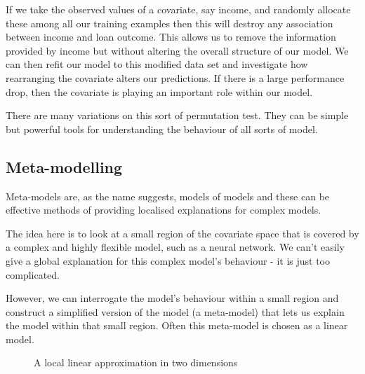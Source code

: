 \documentclass[
  letterpaper,
  DIV=11,
  numbers=noendperiod]{scrreprt}
\begin{document}
If we take the observed values of a covariate, say income, and randomly
allocate these among all our training examples then this will destroy
any association between income and loan outcome. This allows us to
remove the information provided by income but without altering the
overall structure of our model. We can then refit our model to this
modified data set and investigate how rearranging the covariate alters
our predictions. If there is a large performance drop, then the
covariate is playing an important role within our model.

There are many variations on this sort of permutation test. They can be
simple but powerful tools for understanding the behaviour of all sorts
of model.

\subsection{Meta-modelling}\label{meta-modelling}

Meta-models are, as the name suggests, models of models and these can be
effective methods of providing localised explanations for complex
models.

The idea here is to look at a small region of the covariate space that
is covered by a complex and highly flexible model, such as a neural
network. We can't easily give a global explanation for this complex
model's behaviour - it is just too complicated.

However, we can interrogate the model's behaviour within a small region
and construct a simplified version of the model (a meta-model) that lets
us explain the model within that small region. Often this meta-model is
chosen as a linear model.

\begin{figure}


\caption{\label{fig-function-approximation}A local linear approximation
in two dimensions}

\end{figure}%
\end{document}
